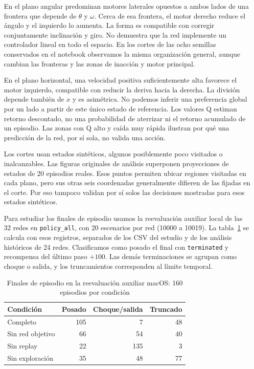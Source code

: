 \documentclass[conference]{IEEEtran}
\begin{document}
En el plano angular predominan motores laterales opuestos a ambos lados de una frontera que depende de $\theta$ y $\omega$. Cerca de esa frontera, el motor derecho reduce el ángulo y el izquierdo lo aumenta. La forma es compatible con corregir conjuntamente inclinación y giro. No demuestra que la red implemente un controlador lineal en todo el espacio. En los cortes de las ocho semillas conservados en el notebook observamos la misma organización general, aunque cambian las fronteras y las zonas de inacción y motor principal.

En el plano horizontal, una velocidad positiva suficientemente alta favorece el motor izquierdo, compatible con reducir la deriva hacia la derecha. La división depende también de $x$ y es asimétrica. No podemos inferir una preferencia global por un lado a partir de este único estado de referencia. Los valores Q estiman retorno descontado, no una probabilidad de aterrizar ni el retorno acumulado de un episodio. Las zonas con Q alto y caída muy rápida ilustran por qué una predicción de la red, por sí sola, no valida una acción.

Los cortes usan estados sintéticos, algunos posiblemente poco visitados o inalcanzables. Las figuras originales de análisis superponen proyecciones de estados de 20 episodios reales. Esos puntos permiten ubicar regiones visitadas en cada plano, pero sus otras seis coordenadas generalmente difieren de las fijadas en el corte. Por eso tampoco validan por sí solos las decisiones mostradas para esos estados sintéticos.

Para estudiar los finales de episodio usamos la reevaluación auxiliar local de las 32 redes en \texttt{policy\_all}, con 20 escenarios por red (10000 a 10019). La tabla~\ref{tab:fines} se calcula con esos registros, separados de los CSV del estudio y de los análisis históricos de 24 redes. Clasificamos como posado el final con \texttt{terminated} y recompensa del último paso $+100$. Las demás terminaciones se agrupan como choque o salida, y los truncamientos corresponden al límite temporal.

\begin{table}[t]
\caption{Finales de episodio en la reevaluación auxiliar macOS: 160 episodios por condición}
\label{tab:fines}
\centering
\begin{tabular}{@{}lrrr@{}}
\toprule
Condición & Posado & Choque/salida & Truncado \\
\midrule
Completo & 105 & 7 & 48 \\
Sin red objetivo & 66 & 54 & 40 \\
Sin replay & 22 & 135 & 3 \\
Sin exploración & 35 & 48 & 77 \\
\bottomrule
\end{tabular}
\end{table}
\end{document}
